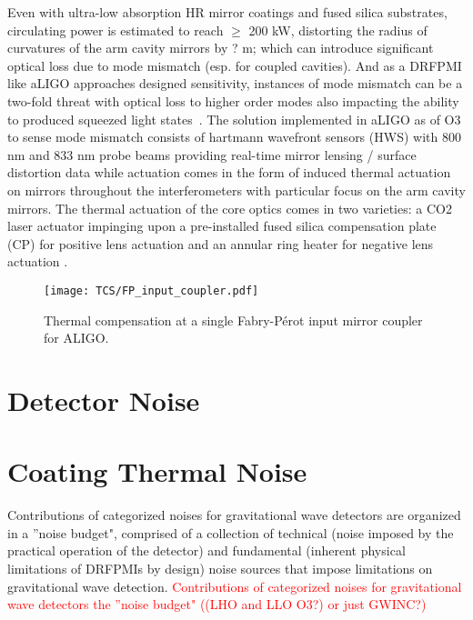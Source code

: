 Even with ultra-low absorption HR mirror coatings and fused silica substrates, circulating power is estimated to reach $\geq$ 200 kW, distorting the radius of curvatures of the arm cavity mirrors by ? m; which can introduce significant optical loss due to mode mismatch (esp. for coupled cavities). And as a DRFPMI like aLIGO approaches designed sensitivity, instances of mode mismatch can be a two-fold threat with optical loss to higher order modes also impacting the ability to produced squeezed light states~\cite{}. The solution implemented in aLIGO as of O3 to sense mode mismatch consists of hartmann wavefront sensors (HWS) with 800 nm and 833 nm probe beams providing real-time mirror lensing / surface distortion data while actuation comes in the form of induced thermal actuation on mirrors throughout the interferometers with particular focus on the arm cavity mirrors. The thermal actuation of the core optics comes in two varieties: a CO2 laser actuator impinging upon a pre-installed fused silica compensation plate (CP) for positive lens actuation and an annular ring heater for negative lens actuation \cite{}. 

\begin{figure}[H]
	\texttt{[image: TCS/FP\_input\_coupler.pdf]}
\caption{Thermal compensation at a single Fabry-P\'{e}rot input mirror coupler for ALIGO.}
 \label{fig:meas}
\end{figure}

\section{Detector Noise}

\section{Coating Thermal Noise}
Contributions of categorized noises for gravitational wave detectors are organized in a ''noise budget", comprised of a collection of technical (noise imposed by the practical operation of the detector) and fundamental (inherent physical limitations of DRFPMIs by design) noise sources that impose limitations on gravitational wave detection.
\textcolor{red}{Contributions of categorized noises for gravitational wave detectors the ''noise budget" ((LHO and LLO O3?) or just GWINC?)}

